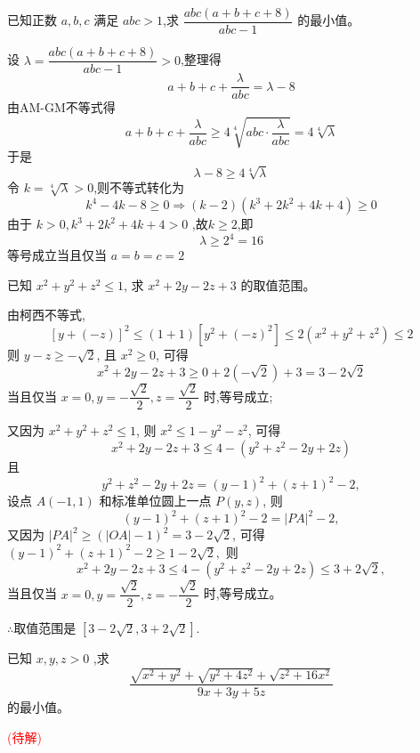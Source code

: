 \begin{questions}
    \question 已知正数 $a,b,c$ 满足 $abc > 1$,求 $\dfrac{abc(a + b + c + 8)}{abc - 1}$ 的最小值。
    \begin{solution}
        设 $\lambda = \dfrac{abc(a + b + c + 8)}{abc - 1} > 0$,整理得
        \[
        a + b + c + \dfrac{\lambda}{abc} = \lambda - 8
        \]
        由AM-GM不等式得
        \[
        a + b + c + \dfrac{\lambda}{abc} \ge 4\sqrt[4]{abc \cdot \dfrac{\lambda}{abc}} = 4\sqrt[4]{\lambda}
        \]
        于是
        \[
        \lambda - 8 \ge 4\sqrt[4]{\lambda}
        \]
        令 $k = \sqrt[4]{\lambda} > 0$,则不等式转化为
        \[
        k^4 - 4k - 8 \ge 0 \Rightarrow (k - 2)(k^3 + 2k^2 + 4k + 4) \ge 0
        \]
        由于 $k > 0,k^3 + 2k^2 + 4k + 4>0$ ,故$k\ge 2$,即  $$\lambda \ge 2^4 = 16$$
        等号成立当且仅当 $a = b = c = 2$
    \end{solution}

    \question 已知 $x^2+y^2+z^2 \leq 1$, 求 $x^2+2y-2z+3$ 的取值范围。
    \begin{solution}
        由柯西不等式, $$[y+(-z)]^2 \leq (1+1)[y^2+(-z)^2] \leq 2(x^2+y^2+z^2) \leq 2$$
        则 $y-z \geq -\sqrt{2}$, 且 $x^2 \geq 0$, 可得 $$x^2+2y-2z+3 \geq 0+2(-\sqrt{2})+3=3-2\sqrt{2}$$
        当且仅当 $x=0, y=-\dfrac{\sqrt{2}}{2}, z=\dfrac{\sqrt{2}}{2}$ 时,等号成立;
        
        又因为 $x^2+y^2+z^2 \leq 1$, 则 $x^2 \leq 1-y^2-z^2$,
        可得 $$x^2+2y-2z+3 \leq 4-(y^2+z^2-2y+2z)$$
        且 $$y^2 + z^2 - 2y + 2z = (y-1)^2 + (z+1)^2 - 2,$$
        设点 $A(-1,1)$ 和标准单位圆上一点 $P(y,z)$, 则 $$(y-1)^2 + (z+1)^2 - 2 = |PA|^2 - 2,$$
        又因为 $|PA|^2 \geq (|OA|-1)^2 = 3-2\sqrt{2}$, 可得 $(y-1)^2 + (z+1)^2 - 2 \geq 1-2\sqrt{2},$
        则 $$x^2+2y-2z+3 \leq 4-(y^2+z^2-2y+2z) \leq 3+2\sqrt{2},$$
        当且仅当 $x=0, y=\dfrac{\sqrt{2}}{2}, z=-\dfrac{\sqrt{2}}{2}$ 时,等号成立。
        
        $\therefore$取值范围是 $[3-2\sqrt{2}, 3+2\sqrt{2}].$
    \end{solution}  

    \question 已知 $x,y,z>0$ ,求 $$\frac{\sqrt{x^{2}+y^{2}}+\sqrt{y^{2}+4z^{2}}+\sqrt{z^{2}+16x^{2}}}{9x+3y+5z}$$ 的最小值。
    \begin{solution}
        \textcolor{red}{(待解)}
    \end{solution}


\end{questions}
